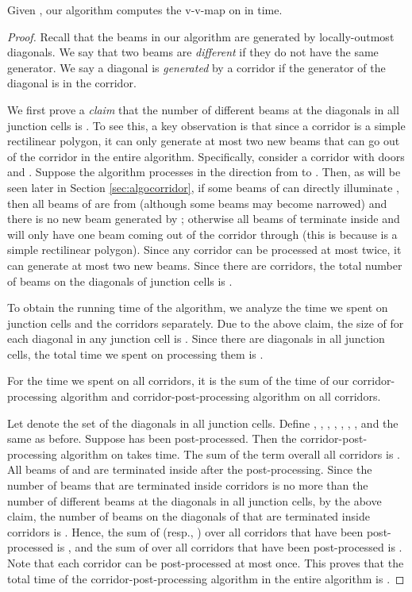 \documentclass[english,runningheads,11pt]{llncs-revised}
\begin{document}
\begin{lemma}
Given , our algorithm computes the v-v-map on  in  time.
\end{lemma}
\begin{proof}
Recall that the beams in our algorithm are generated by
locally-outmost diagonals. We say that two beams are {\em different}
if they do not have the same generator. We say a diagonal is {\em generated}
by a corridor if the generator of the
diagonal is in the corridor.

We first prove a {\em claim} that the
number of different beams at the diagonals in all junction cells is . To see this, a key
observation is that since a corridor is a simple rectilinear polygon,
it can only generate at most two new beams that can
go out of the corridor in the entire algorithm. Specifically, consider a
corridor  with doors  and . Suppose the algorithm
processes  in the direction from  to . Then, as will be seen later in Section \ref{sec:algocorridor}, if some beams of  can directly illuminate , then all beams of
 are from  (although some beams may become narrowed) and there is no new beam generated by ;
otherwise all beams of  terminate inside  and
 will only have one beam coming out of the corridor through  (this is because  is a simple rectilinear polygon).
Since any corridor can be processed at most twice,
it can generate at most two new beams.
Since there are  corridors, the total number of beams on
the diagonals of junction cells is .

To obtain the running time of the algorithm, we analyze the
time we spent on junction cells and the corridors separately. Due to the above
claim, the size of  for each diagonal  in any junction cell
is . Since there are  diagonals in all junction cells,
the total time we spent on processing them is .

For the time we spent on all corridors, it is the sum of the time
of our corridor-processing algorithm and corridor-post-processing
algorithm on all corridors.

Let  denote the set of the diagonals in all junction cells.
Define , , , , , , , and  the same as before. Suppose
 has been post-processed. Then the
corridor-post-processing algorithm on  takes
 time. The sum of the term  overall all
corridors is . All beams of  and  are terminated
inside  after the post-processing. Since the number of beams that are terminated inside corridors is no more than the number of different beams at the diagonals in all junction cells, by the above claim, the number of beams on the
diagonals of  that are terminated inside corridors is . Hence, the sum of
 (resp., ) over all corridors that have been post-processed
is , and the sum of  over all
corridors that have been post-processed is . Note that
each corridor can be post-processed at most once. This proves
that the total time of the corridor-post-processing algorithm in the
entire algorithm is .


\end{proof}
\end{document}
